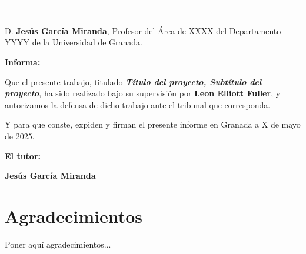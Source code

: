 \chapter*{}
\thispagestyle{empty}

\noindent\rule[-1ex]{\textwidth}{2pt}\\[4.5ex]

D. \textbf{Jesús García Miranda}, Profesor del Área de XXXX del Departamento YYYY de la Universidad de Granada.

\vspace{0.5cm}

\vspace{0.5cm}

\textbf{Informa:}

\vspace{0.5cm}

Que el presente trabajo, titulado \textit{\textbf{Título del proyecto, Subtítulo del proyecto}},
ha sido realizado bajo su supervisión por \textbf{Leon Elliott Fuller}, y autorizamos la defensa de dicho trabajo ante el tribunal
que corresponda.

\vspace{0.5cm}

Y para que conste, expiden y firman el presente informe en Granada a X de mayo de 2025.

\vspace{1cm}

\textbf{El tutor:}

\vspace{5cm}

\noindent \textbf{Jesús García Miranda}

\chapter*{Agradecimientos}
\thispagestyle{empty}

       \vspace{1cm}


Poner aquí agradecimientos...

